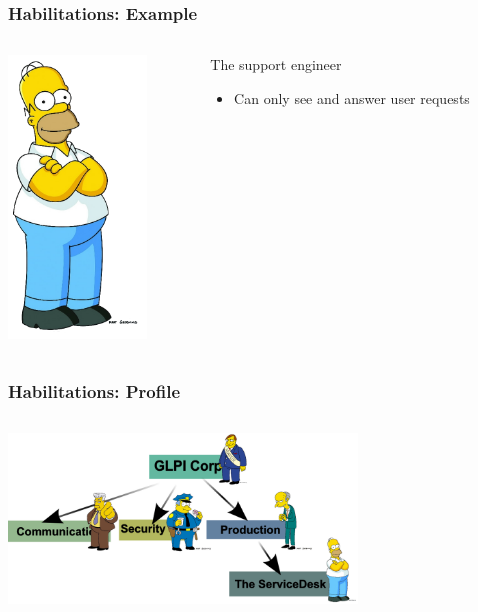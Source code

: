 \documentclass{beamer}
\begin{document}
\begin{frame}
\frametitle{Habilitations: Example}
\begin{columns}
 \begin{column}{0.45\textwidth}
         \includegraphics[height=7.5cm]{./pics/simpsons/homer.png}
 \end{column}
 \begin{column}{0.45\textwidth}
    \begin{block}{The support engineer}
        \begin{itemize}
            \item Can only see and answer user requests
        \end{itemize}
    \end{block}
 \end{column}
\end{columns}
\end{frame}



\begin{frame}
\frametitle{Habilitations: Profile}
\begin{columns}
 \begin{column}{0.45\textwidth}
         \includegraphics[height=4.5cm]{./pics/entites-ppl.png}
 \end{column}
 \begin{column}{0.45\textwidth}
 \end{column}
\end{columns}
\end{frame}
\end{document}
